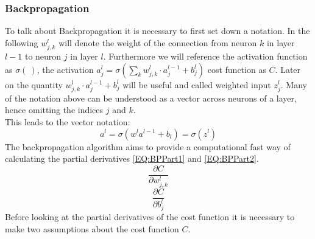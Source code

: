 			\subsubsection{Backpropagation}
				\label{BackProp}
				To talk about Backpropagation it is necessary to first set down a notation. In the following $w^l_{j,k}$ will denote the weight of the connection from neuron $k$ in layer $l-1$ to neuron $j$ in layer $l$. Furthermore we will reference the activation function as $\sigma(\:)$, the activation $a^l_j = \sigma \left( \sum^{}_{k} w^l_{j,k} \cdot a^{l-1}_j +b^l_j \right)$ cost function as $C$. Later on the quantity $w^l_{j,k} \cdot a^{l-1}_j +b^l_j$ will be useful and called weighted input $z^l_j$. Many of the notation above can be understood as a vector across neurons of a layer, hence omitting the indices $j$ and $k$.\\
				This leads to the vector notation:
				\begin{equation}
					a^l = \sigma(w^l a^{l-1} + b_l) = \sigma(z^l)
					\label{EQ:Activation}
				\end{equation}
				The backpropagation algorithm aims to provide a computational fast way of calculating the partial derivatives \ref{EQ:BPPart1} and \ref{EQ:BPPart2}. 
				\begin{equation}
					\frac{\partial C}{\partial w^l_{j,k}}
					\label{EQ:BPPart1}
				\end{equation}
				\begin{equation}
					\frac{\partial C}{\partial b^l_j}
					\label{EQ:BPPart2}
				\end{equation}
				Before looking at the partial derivatives of the cost function it is necessary to make two assumptions about the cost function $C$.			
